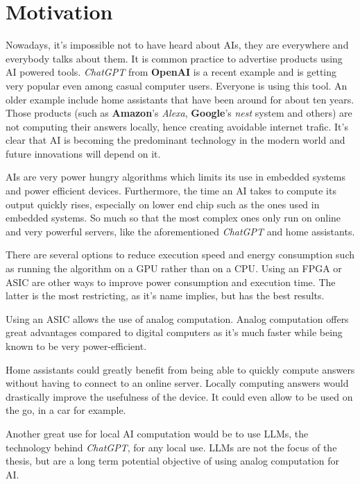 \section{Motivation}
\label{sec:motivation}

Nowadays, it's impossible not to have heard about \acp{AI}, they are everywhere and everybody talks about them. It is common practice to advertise products using \ac{AI} powered tools. \textit{ChatGPT} from \textbf{OpenAI} is a recent example and is getting very popular even among casual computer users. Everyone is using this tool. An older example include home assistants that have been around for about ten years. Those products (such as \textbf{Amazon}'s \textit{Alexa}, \textbf{Google}'s \textit{nest} system and others) are not computing their answers locally, hence creating avoidable internet trafic. It's clear that \ac{AI} is becoming the predominant technology in the modern world and future innovations will depend on it.

\acp{AI} are very power hungry algorithms which limits its use in embedded systems and power efficient devices.
Furthermore, the time an \ac{AI} takes to compute its output quickly rises, especially on lower end chip such as the ones used in embedded systems. So much so that the most complex ones only run on online and very powerful servers, like the aforementioned \textit{ChatGPT} and home assistants.

There are several options to reduce execution speed and energy consumption such as running the algorithm on a \ac{GPU} rather than on a \ac{CPU}. Using an \ac{FPGA} or \ac{ASIC} are other ways to improve power consumption and execution time.
The latter is the most restricting, as it's name implies, but has the best results.

Using an \ac{ASIC} allows the use of analog computation. Analog computation offers great advantages compared to digital computers as it's much faster while being known to be very power-efficient.

Home assistants could greatly benefit from being able to quickly compute answers without having to connect to an online server. Locally computing answers would drastically improve the usefulness of the device. It could even allow to be used on the go, in a car for example.

Another great use for local \ac{AI} computation would be to use \acp{LLM}, the technology behind \textit{ChatGPT}, for any local use. \acp{LLM} are not the focus of the thesis, but are a long term potential objective of using analog computation for \ac{AI}.

